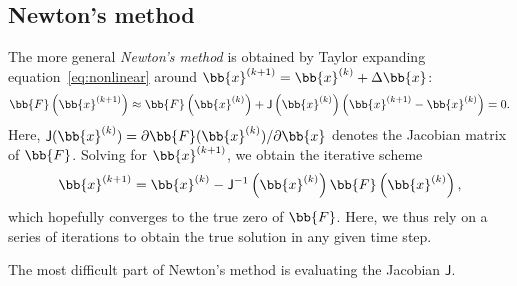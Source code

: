 \documentclass{notes}
\newcommand{\Jac}{\mathsf{J}}
\begin{document}
    \subsection{Newton's method}
    The more general \emph{Newton's method} is obtained by Taylor expanding
    equation~\eqref{eq:nonlinear} around $\bb{x}^{(k+1)} = \bb{x}^{(k)} + \Delta\bb{x}$:
    \begin{equation}
        \bb{F}\left( \bb{x}^{(k+1)} \right)\approx \bb{F}\left(\bb{x}^{(k)}\right) +
        \Jac\left(\bb{x}^{(k)}\right) \left( \bb{x}^{(k+1)} - \bb{x}^{(k)} \right) = 0.
    \end{equation}
    Here, $\Jac(\bb{x}^{(k)}) = \partial\bb{F}(\bb{x}^{(k)})/\partial\bb{x}$
    denotes the Jacobian matrix of $\bb{F}$. Solving for $\bb{x}^{(k+1)}$, we
    obtain the iterative scheme
    \begin{equation}
        \bb{x}^{(k+1)} = \bb{x}^{(k)} - \Jac^{-1}\left( \bb{x}^{(k)} \right) \bb{F}\left( \bb{x}^{(k)} \right),
    \end{equation}
    which hopefully converges to the true zero of $\bb{F}$. Here, we thus rely
    on a series of iterations to obtain the true solution in any given time
    step.

    The most difficult part of Newton's method is evaluating the Jacobian
    $\Jac$.

    \printbibliography
\end{document}
